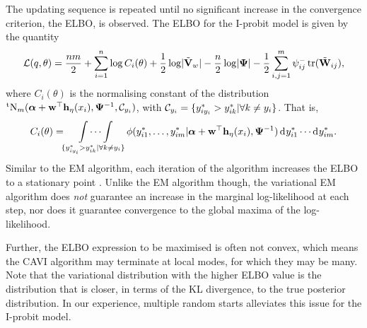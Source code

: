 The updating sequence is repeated until no significant increase in the convergence criterion, the ELBO, is observed.
The ELBO for the I-probit model is given by the quantity
\begin{align}
  \cL(q, \theta) = \half[nm] + \sum_{i=1}^n \log C_i(\theta) + \half\log \abs{\tilde\bV_w} - \half[n]\log\abs{\bPsi} - \half\sum_{i,j=1}^m \psi_{ij}^- \tr(\tilde\bW_{ij}),
\end{align}
where $C_i(\theta)$ is the normalising constant of the distribution $\tN_m(\balpha + \bw^\top\bh_\eta(x_i),\bPsi^{-1},\cC_{y_i})$, with $\cC_{y_i} = \{y_{iy_i}^* > y_{ik}^* | \forall k \neq y_i \}$.
That is,
\[
  C_i(\theta) = \idotsint\displaylimits_{\{y_{iy_i}^* > y_{ik}^* | \forall k \neq y_i \}} \phi(y_{i1}^*, \dots, y_{im}^*|\balpha + \bw^\top\bh_\eta(x_i), \bPsi^{-1}) \dint y_{i1}^* \cdots \dint y_{im}^*.
\]
Similar to the EM algorithm, each iteration of the algorithm increases the ELBO to a stationary point \citep{blei2017variational}.
Unlike the EM algorithm though, the variational EM algorithm does \emph{not} guarantee an increase in the marginal log-likelihood at each step, nor does it guarantee convergence to the global maxima of the log-likelihood.

Further, the ELBO expression to be maximised is often not convex, which means the CAVI algorithm may terminate at local modes, for which they may be many.
Note that the variational distribution with the higher ELBO value is the distribution that is closer, in terms of the KL divergence, to the true posterior distribution.
In our experience, multiple random starts alleviates this issue for the I-probit model.


